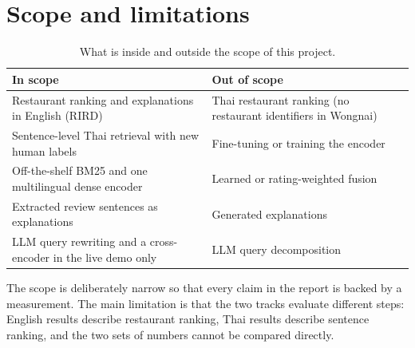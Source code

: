 \section{Scope and limitations}
\begin{table}[H]
\centering\small
\caption{What is inside and outside the scope of this project.}
\label{tab:scope}
\begin{tabularx}{\textwidth}{@{}LL@{}}
\toprule
In scope & Out of scope\\
\midrule
Restaurant ranking and explanations in English (RIRD) & Thai restaurant ranking (no restaurant
identifiers in Wongnai)\\
Sentence-level Thai retrieval with new human labels & Fine-tuning or training the encoder\\
Off-the-shelf BM25 and one multilingual dense encoder & Learned or rating-weighted fusion\\
Extracted review sentences as explanations & Generated explanations\\
LLM query rewriting and a cross-encoder in the live demo only & LLM query decomposition
\citep{korikov2024multiaspect}\\
\bottomrule
\end{tabularx}
\end{table}
The scope is deliberately narrow so that every claim in the report is backed by a measurement.
The main limitation is that the two tracks evaluate different steps: English results describe
restaurant ranking, Thai results describe sentence ranking, and the two sets of numbers cannot
be compared directly.
